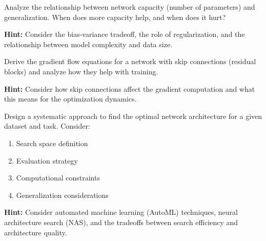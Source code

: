 \begin{problem}
\label{prob:capacity-analysis}

Analyze the relationship between network capacity (number of parameters) and generalization. When does more capacity help, and when does it hurt?

\textbf{Hint:} Consider the bias-variance tradeoff, the role of regularization, and the relationship between model complexity and data size.
\end{problem}

\begin{problem}
\label{prob:gradient-flow}

Derive the gradient flow equations for a network with skip connections (residual blocks) and analyze how they help with training.

\textbf{Hint:} Consider how skip connections affect the gradient computation and what this means for the optimization dynamics.
\end{problem}

\begin{problem}
\label{prob:architecture-search}

Design a systematic approach to find the optimal network architecture for a given dataset and task. Consider:
\begin{enumerate}
    \item Search space definition
    \item Evaluation strategy
    \item Computational constraints
    \item Generalization considerations
\end{enumerate}

\textbf{Hint:} Consider automated machine learning (AutoML) techniques, neural architecture search (NAS), and the tradeoffs between search efficiency and architecture quality.
\end{problem}

